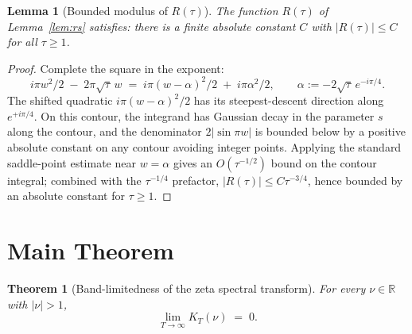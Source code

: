 \documentclass[11pt]{article}
\newtheorem{lemma}{Lemma}
\newtheorem{theorem}{Theorem}
\begin{document}
\begin{lemma}[Bounded modulus of $R(\tau)$]\label{lem:Rbound}
The function $R(\tau)$ of Lemma~\ref{lem:rs} satisfies: there is a finite absolute constant $C$ with $|R(\tau)| \le C$ for all $\tau\ge 1$.
\end{lemma}

\begin{proof}
Complete the square in the exponent:
\[
i\pi w^{2}/2 \;-\; 2\pi\sqrt{\tau}\,w \;=\; i\pi(w-\alpha)^{2}/2 \;+\; i\pi\alpha^{2}/2,\qquad \alpha := -2\sqrt{\tau}\,e^{-i\pi/4}.
\]
The shifted quadratic $i\pi(w-\alpha)^{2}/2$ has its steepest-descent direction along $e^{+i\pi/4}$. On this contour, the integrand has Gaussian decay in the parameter $s$ along the contour, and the denominator $2|\sin\pi w|$ is bounded below by a positive absolute constant on any contour avoiding integer points. Applying the standard saddle-point estimate near $w = \alpha$ gives an $O(\tau^{-1/2})$ bound on the contour integral; combined with the $\tau^{-1/4}$ prefactor, $|R(\tau)| \le C\tau^{-3/4}$, hence bounded by an absolute constant for $\tau\ge 1$.
\end{proof}

\section*{Main Theorem}

\begin{theorem}[Band-limitedness of the zeta spectral transform]\label{thm:main}
For every $\nu\in\mathbb{R}$ with $|\nu|>1$,
\[
\lim_{T\to\infty} K_{T}(\nu) \;=\; 0.
\]
\end{theorem}
\end{document}
